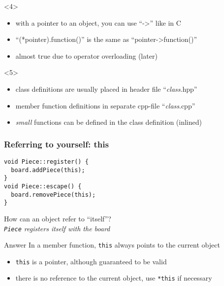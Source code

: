 \documentclass{slides}
\begin{document}
\begin{frame}
  \begin{onlyenv}<4>
    \begin{itemize}
    \item with a pointer to an object, you can use ``->'' like in C
    \item ``(*pointer).function()'' is the same as ``pointer->function()''
    \item almost true due to operator overloading (later)
    \end{itemize}
  \end{onlyenv}

  \begin{onlyenv}<5>
    \begin{itemize}
    \item class definitions are usually placed in header file ``\textit{class}.hpp''
    \item member function definitions in separate cpp-file ``\textit{class}.cpp''
    \item \emph{small} functions can be defined in the class definition (\alert{inlined})
    \end{itemize}
  \end{onlyenv}

\end{frame}

\begin{frame}[fragile]
  \frametitle{Referring to yourself: this}

\begin{lstlisting}[emph={this}]
void Piece::register() {
  board.addPiece(this);
}
void Piece::escape() {
  board.removePiece(this);
}
\end{lstlisting}

  \begin{block}{}
    How can an object refer to ``itself''?\\
    \emph{\lstinline!Piece! registers itself with the board}
  \end{block}

  \begin{block}{Answer}
    In a member function, \lstinline!this! always points to the
    current object
  \end{block}

  \begin{itemize}
  \item \lstinline!this! is a pointer, although guaranteed to be valid
  \item there is no reference to the current object, use \lstinline!*this!
    if necessary
  \end{itemize}
\end{frame}
\end{document}
